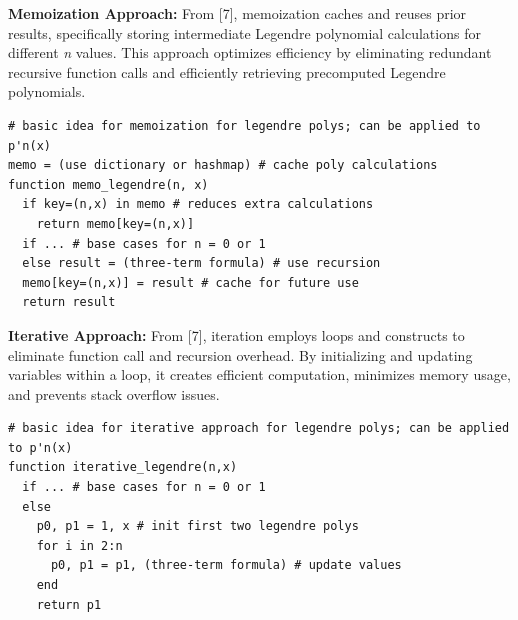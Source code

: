 \documentclass[twoside]{article}
\begin{document}
\textbf{Memoization Approach:}
From [7], memoization caches and reuses prior results, specifically storing intermediate Legendre polynomial calculations for different \textit{n} values. This approach optimizes efficiency by eliminating redundant recursive function calls and efficiently retrieving precomputed Legendre polynomials.
\begin{small}
\begin{verbatim}
# basic idea for memoization for legendre polys; can be applied to p'n(x)
memo = (use dictionary or hashmap) # cache poly calculations
function memo_legendre(n, x)
  if key=(n,x) in memo # reduces extra calculations
    return memo[key=(n,x)]
  if ... # base cases for n = 0 or 1
  else result = (three-term formula) # use recursion
  memo[key=(n,x)] = result # cache for future use
  return result
\end{verbatim}
\end{small}

\textbf{Iterative Approach:}
From [7], iteration employs loops and constructs to eliminate function call and recursion overhead. By initializing and updating variables within a loop, it creates efficient computation, minimizes memory usage, and prevents stack overflow issues.

\begin{small}
\begin{verbatim}
# basic idea for iterative approach for legendre polys; can be applied to p'n(x)
function iterative_legendre(n,x)
  if ... # base cases for n = 0 or 1
  else
    p0, p1 = 1, x # init first two legendre polys
    for i in 2:n
      p0, p1 = p1, (three-term formula) # update values
    end
    return p1
\end{verbatim}
\end{small}

\end{document}
